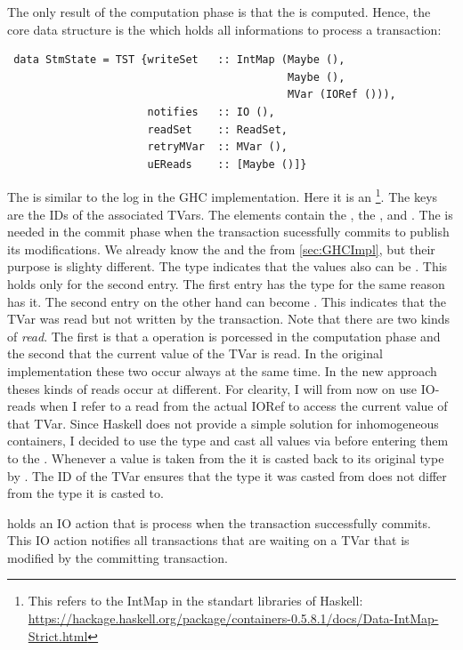 The only result of the computation phase is that the  is computed.
Hence, the core data structure is the  which holds all informations to process a transaction:
\begin{lstlisting}
 data StmState = TST {writeSet   :: IntMap (Maybe (),
                                            Maybe (),
                                            MVar (IORef ())),
                      notifies   :: IO (),
                      readSet    :: ReadSet,
                      retryMVar  :: MVar (),
                      uEReads    :: [Maybe ()]}
\end{lstlisting}
The  is similar to the log in the GHC implementation. Here it is an  
\footnote{This refers to the IntMap in the standart libraries of Haskell: \url{https://hackage.haskell.org/package/containers-0.5.8.1/docs/Data-IntMap-Strict.html}}. 
The keys are the IDs of the associated TVars. The elements contain the ,
the , and . The  is needed in the commit
phase when the transaction sucessfully commits to publish its modifications. We already know the 
 and the  from \ref{sec:GHCImpl}, but their purpose is slighty 
different. The  type indicates that the values also can be . This holds
only for the second entry. The first entry has the  type for the same reason 
 has it. The second entry on the other hand can become . This indicates
that the TVar was read but not written by the transaction. Note that there are two kinds of 
\textit{read}. The first is that a  operation is porcessed in the computation phase
and the second that the current value of the TVar is read. In the original implementation these 
two occur always at the same time. In the new approach theses kinds of reads occur at different.
For clearity, I will from now on use IO-reads when I refer to a read from the actual IORef to access
the current value of that TVar. Since Haskell does not provide a simple solution for inhomogeneous
containers, I decided to use the type \code{()} and cast all values via  before
entering them to the . Whenever a value is taken from the  it
is casted back to its original type by . The ID of the TVar ensures that 
the type it was casted from does not differ from the type it is casted to.

 holds an IO action that is process when the transaction successfully commits.
This IO action notifies all transactions that are waiting on a TVar that is modified by the 
committing transaction.

